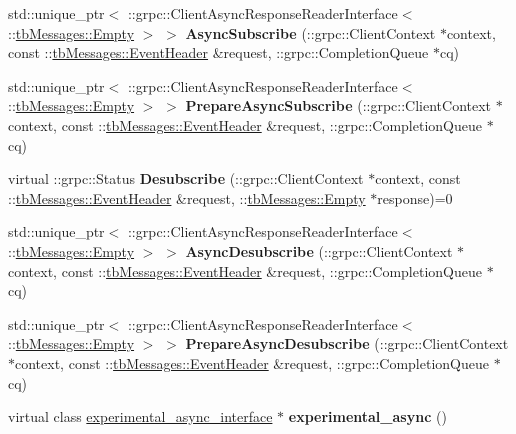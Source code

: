 \begin{DoxyCompactItemize}
std\+::unique\+\_\+ptr$<$ \+::grpc\+::\+Client\+Async\+Response\+Reader\+Interface$<$ \+::\hyperlink{classtbMessages_1_1Empty}{tb\+Messages\+::\+Empty} $>$ $>$ {\bfseries Async\+Subscribe} (\+::grpc\+::\+Client\+Context $\ast$context, const \+::\hyperlink{classtbMessages_1_1EventHeader}{tb\+Messages\+::\+Event\+Header} \&request, \+::grpc\+::\+Completion\+Queue $\ast$cq)
\item 
\mbox{\label{classtbMessages_1_1TarboraMessages_1_1StubInterface_a4199941199ff9ff6c1c96ffb5672e43f}} 
std\+::unique\+\_\+ptr$<$ \+::grpc\+::\+Client\+Async\+Response\+Reader\+Interface$<$ \+::\hyperlink{classtbMessages_1_1Empty}{tb\+Messages\+::\+Empty} $>$ $>$ {\bfseries Prepare\+Async\+Subscribe} (\+::grpc\+::\+Client\+Context $\ast$context, const \+::\hyperlink{classtbMessages_1_1EventHeader}{tb\+Messages\+::\+Event\+Header} \&request, \+::grpc\+::\+Completion\+Queue $\ast$cq)
\item 
\mbox{\label{classtbMessages_1_1TarboraMessages_1_1StubInterface_a5e4464e5bae6ed420192b9b9bb91446c}} 
virtual \+::grpc\+::\+Status {\bfseries Desubscribe} (\+::grpc\+::\+Client\+Context $\ast$context, const \+::\hyperlink{classtbMessages_1_1EventHeader}{tb\+Messages\+::\+Event\+Header} \&request, \+::\hyperlink{classtbMessages_1_1Empty}{tb\+Messages\+::\+Empty} $\ast$response)=0
\item 
\mbox{\label{classtbMessages_1_1TarboraMessages_1_1StubInterface_acf51f0277e1ee6cda8cd6b8136601f06}} 
std\+::unique\+\_\+ptr$<$ \+::grpc\+::\+Client\+Async\+Response\+Reader\+Interface$<$ \+::\hyperlink{classtbMessages_1_1Empty}{tb\+Messages\+::\+Empty} $>$ $>$ {\bfseries Async\+Desubscribe} (\+::grpc\+::\+Client\+Context $\ast$context, const \+::\hyperlink{classtbMessages_1_1EventHeader}{tb\+Messages\+::\+Event\+Header} \&request, \+::grpc\+::\+Completion\+Queue $\ast$cq)
\item 
\mbox{\label{classtbMessages_1_1TarboraMessages_1_1StubInterface_a56d6d7bba9679d2ad8a0ad22c5c9ffd7}} 
std\+::unique\+\_\+ptr$<$ \+::grpc\+::\+Client\+Async\+Response\+Reader\+Interface$<$ \+::\hyperlink{classtbMessages_1_1Empty}{tb\+Messages\+::\+Empty} $>$ $>$ {\bfseries Prepare\+Async\+Desubscribe} (\+::grpc\+::\+Client\+Context $\ast$context, const \+::\hyperlink{classtbMessages_1_1EventHeader}{tb\+Messages\+::\+Event\+Header} \&request, \+::grpc\+::\+Completion\+Queue $\ast$cq)
\item 
\mbox{\label{classtbMessages_1_1TarboraMessages_1_1StubInterface_ae667e6f712914cfe8074c40142d1095c}} 
virtual class \hyperlink{classtbMessages_1_1TarboraMessages_1_1StubInterface_1_1experimental__async__interface}{experimental\+\_\+async\+\_\+interface} $\ast$ {\bfseries experimental\+\_\+async} ()
\end{DoxyCompactItemize}


